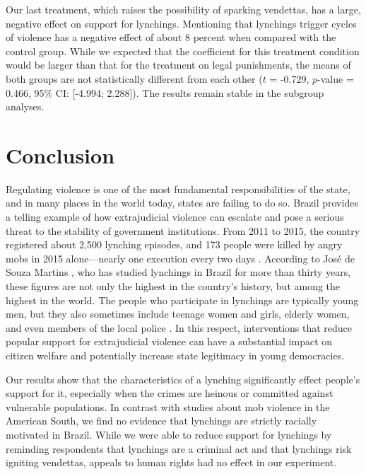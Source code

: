 \documentclass[12pt,a4paper]{article}
\begin{document}
Our last treatment, which raises the possibility of sparking vendettas, has a
large, negative effect on support for lynchings. Mentioning that lynchings
trigger cycles of violence has a negative effect of about 8 percent when
compared with the control group. While we expected that the coefficient for
this treatment condition would be larger than that for the treatment on legal
punishments, the means of both groups are not statistically different from each
other ($t$ = -0.729, $p$-value = 0.466, 95\% CI: [-4.994; 2.288]). The results
remain stable in the subgroup analyses. 

\section{Conclusion}
\label{conclusion}

Regulating violence is one of the most fundamental responsibilities of the
state, and in many places in the world today, states are failing to do so.
Brazil provides a telling example of how extrajudicial violence can escalate
and pose a serious threat to the stability of government institutions. From
2011 to 2015, the country registered about 2,500 lynching episodes, and 173
people were killed by angry mobs in 2015 alone---nearly one execution every two
days \citep{barbara2015vigilantes, oliveira2016mob}. According to José de Souza
Martins \citeyearpar{martins2015linchamentos}, who has studied lynchings in
Brazil for more than thirty years, these figures are not only the highest in
the country's history, but among the highest in the world. The people who
participate in lynchings are typically young men, but they also sometimes
include teenage women and girls, elderly women, and even members of the local
police \citep{moura2017linchamentos}. In this respect, interventions that
reduce popular support for extrajudicial violence can have a substantial impact
on citizen welfare and potentially increase state legitimacy in young
democracies.

Our results show that the characteristics of a lynching significantly effect
people's support for it, especially when the crimes are heinous or committed
against vulnerable populations. In contrast with studies about mob violence in
the American South, we find no evidence that lynchings are strictly racially
motivated in Brazil. While we were able to reduce support for lynchings by
reminding respondents that lynchings are a criminal act and that lynchings risk
igniting vendettas, appeals to human rights had no effect in our experiment. 
\end{document}
